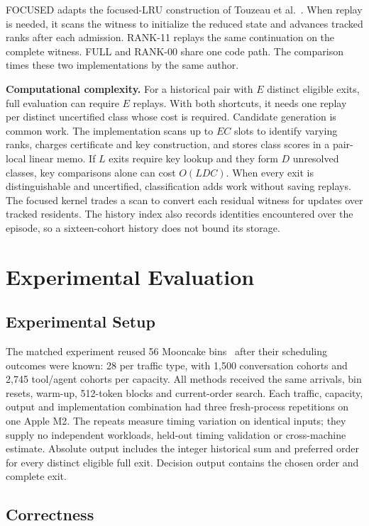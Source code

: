 \documentclass[11pt,letterpaper]{article}
\begin{document}
FOCUSED adapts the focused-LRU construction of Touzeau et al.~\cite{touzeau}. When replay is needed, it scans the witness to initialize the reduced state and advances tracked ranks after each admission. RANK-11 replays the same continuation on the complete witness. FULL and RANK-00 share one code path. The comparison times these two implementations by the same author.

\textbf{Computational complexity.} For a historical pair with $E$ distinct eligible exits, full evaluation can require $E$ replays. With both shortcuts, it needs one replay per distinct uncertified class whose cost is required. Candidate generation is common work. The implementation scans up to $EC$ slots to identify varying ranks, charges certificate and key construction, and stores class scores in a pair-local linear memo. If $L$ exits require key lookup and they form $D$ unresolved classes, key comparisons alone can cost $O(LDC)$. When every exit is distinguishable and uncertified, classification adds work without saving replays. The focused kernel trades a scan to convert each residual witness for updates over tracked residents. The history index also records identities encountered over the episode, so a sixteen-cohort history does not bound its storage.

\section{Experimental Evaluation}

\subsection{Experimental Setup}

The matched experiment reused 56 Mooncake bins~\cite{moon} after their scheduling outcomes were known: 28 per traffic type, with 1,500 conversation cohorts and 2,745 tool/agent cohorts per capacity. All methods received the same arrivals, bin resets, warm-up, 512-token blocks and current-order search. Each traffic, capacity, output and implementation combination had three fresh-process repetitions on one Apple M2. The repeats measure timing variation on identical inputs; they supply no independent workloads, held-out timing validation or cross-machine estimate. Absolute output includes the integer historical sum and preferred order for every distinct eligible full exit. Decision output contains the chosen order and complete exit.

\subsection{Correctness}
\end{document}
